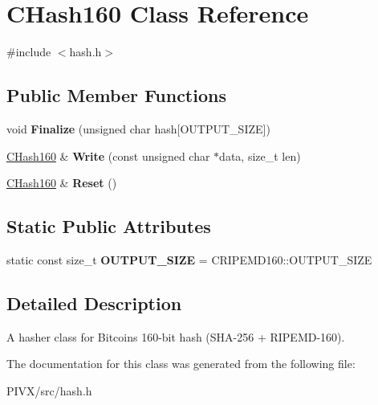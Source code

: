 \hypertarget{class_c_hash160}{}\section{C\+Hash160 Class Reference}
\label{class_c_hash160}


{\ttfamily \#include $<$hash.\+h$>$}

\subsection*{Public Member Functions}
\begin{DoxyCompactItemize}
\item 
\mbox{\label{class_c_hash160_a9bb08e1772002ae1a5d85017ba7952ee}} 
void {\bfseries Finalize} (unsigned char hash\mbox{[}O\+U\+T\+P\+U\+T\+\_\+\+S\+I\+ZE\mbox{]})
\item 
\mbox{\label{class_c_hash160_af56cdd9443013eb68b246aa8450217f2}} 
\mbox{\hyperlink{class_c_hash160}{C\+Hash160}} \& {\bfseries Write} (const unsigned char $\ast$data, size\+\_\+t len)
\item 
\mbox{\label{class_c_hash160_a971a8d59073455b1ef0ac0f65e964772}} 
\mbox{\hyperlink{class_c_hash160}{C\+Hash160}} \& {\bfseries Reset} ()
\end{DoxyCompactItemize}
\subsection*{Static Public Attributes}
\begin{DoxyCompactItemize}
\item 
\mbox{\label{class_c_hash160_a1a5618e17d91ea96e86d779f575211eb}} 
static const size\+\_\+t {\bfseries O\+U\+T\+P\+U\+T\+\_\+\+S\+I\+ZE} = C\+R\+I\+P\+E\+M\+D160\+::\+O\+U\+T\+P\+U\+T\+\_\+\+S\+I\+ZE
\end{DoxyCompactItemize}


\subsection{Detailed Description}
A hasher class for Bitcoin\textquotesingle{}s 160-\/bit hash (S\+H\+A-\/256 + R\+I\+P\+E\+M\+D-\/160). 

The documentation for this class was generated from the following file\+:\begin{DoxyCompactItemize}
\item 
P\+I\+V\+X/src/hash.\+h\end{DoxyCompactItemize}
